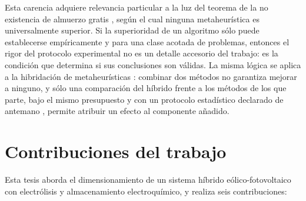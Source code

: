 Esta carencia adquiere relevancia particular a la luz del teorema de la no existencia de almuerzo gratis \cite{Wolpert1997NFL}, según el cual ninguna metaheurística es universalmente superior. Si la superioridad de un algoritmo sólo puede establecerse empíricamente y para una clase acotada de problemas, entonces el rigor del protocolo experimental no es un detalle accesorio del trabajo: es la condición que determina si sus conclusiones son válidas. La misma lógica se aplica a la hibridación de metaheurísticas \cite{Talbi2002Taxonomy}: combinar dos métodos no garantiza mejorar a ninguno, y sólo una comparación del híbrido frente a los métodos de los que parte, bajo el mismo presupuesto y con un protocolo estadístico declarado de antemano \cite{Demsar2006Statistical,Derrac2011Tutorial}, permite atribuir un efecto al componente añadido.

\section{Contribuciones del trabajo}

Esta tesis aborda el dimensionamiento de un sistema híbrido eólico-fotovoltaico con electrólisis y almacenamiento electroquímico, y realiza seis contribuciones:

